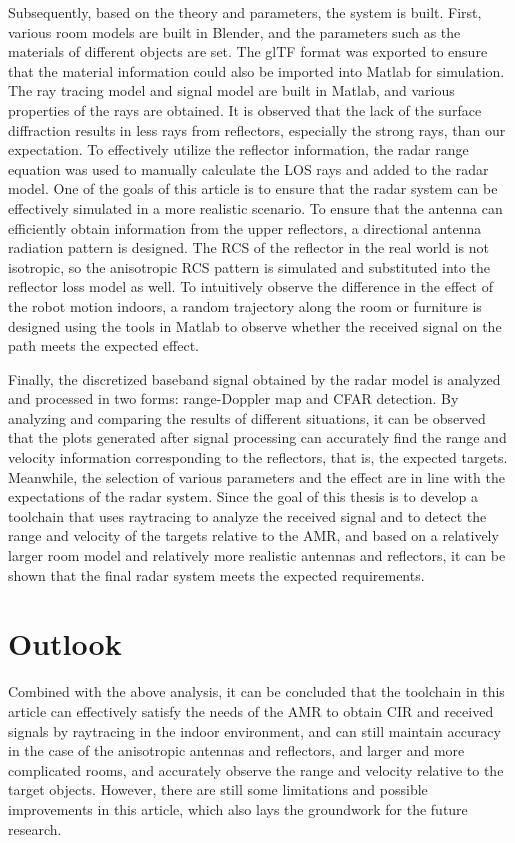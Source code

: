 \documentclass[12pt,DIV14,BCOR12mm,a4paper,footinclude=false,headinclude,parskip=half-,twoside,openright,cleardoublepage=empty,toc=index,bibliography=totoc,listof=totoc]{scrreprt}
\numberwithin{equation}{chapter}
\begin{document}
Subsequently, based on the theory and parameters, the system is built. First, various room models are built in Blender, and the parameters such as the materials of different objects are set. The glTF format was exported to ensure that the material information could also be imported into Matlab for simulation. The ray tracing model and signal model are built in Matlab, and various properties of the rays are obtained. It is observed that the lack of the surface diffraction results in less rays from reflectors, especially the strong rays, than our expectation. To effectively utilize the reflector information, the radar range equation was used to manually calculate the LOS rays and added to the radar model. One of the goals of this article is to ensure that the radar system can be effectively simulated in a more realistic scenario. To ensure that the antenna can efficiently obtain information from the upper reflectors, a directional antenna radiation pattern is designed. The RCS of the reflector in the real world is not isotropic, so the anisotropic RCS pattern is simulated and substituted into the reflector loss model as well. To intuitively observe the difference in the effect of the robot motion indoors, a random trajectory along the room or furniture is designed using the tools in Matlab to observe whether the received signal on the path meets the expected effect.

Finally, the discretized baseband signal obtained by the radar model is analyzed and processed in two forms: range-Doppler map and CFAR detection. By analyzing and comparing the results of different situations, it can be observed that the plots generated after signal processing can accurately find the range and velocity information corresponding to the reflectors, that is, the expected targets. Meanwhile, the selection of various parameters and the effect are in line with the expectations of the radar system. Since the goal of this thesis is to develop a toolchain that uses raytracing to analyze the received signal and to detect the range and velocity of the targets relative to the AMR, and based on a relatively larger room model and relatively more realistic antennas and reflectors, it can be shown that the final radar system meets the expected requirements.

\section{Outlook}

Combined with the above analysis, it can be concluded that the toolchain in this article can effectively satisfy the needs of the AMR to obtain CIR and received signals by raytracing in the indoor environment, and can still maintain accuracy in the case of the anisotropic antennas and reflectors, and larger and more complicated rooms, and accurately observe the range and velocity relative to the target objects. However, there are still some limitations and possible improvements in this article, which also lays the groundwork for the future research.
\end{document}
